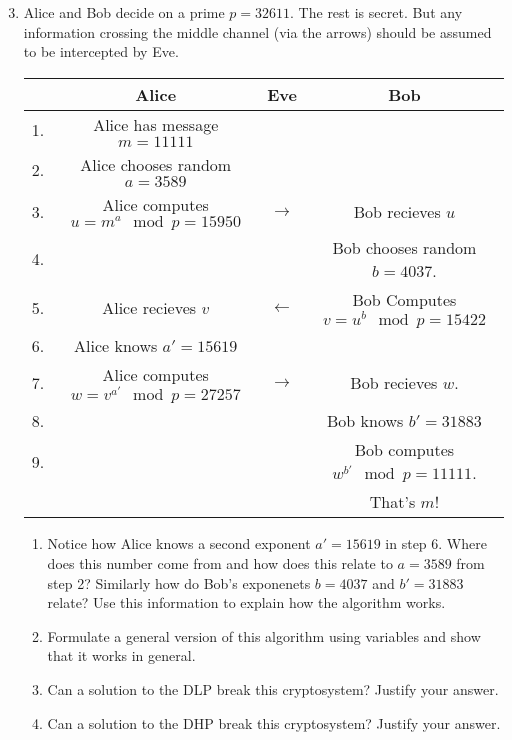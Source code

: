 \documentclass[11pt]{article}
\begin{document}
\begin{enumerate}
  \setcounter{enumi}{2}
  \item{
  Alice and Bob decide on a prime $p = 32611$.  The rest is secret.  But any information crossing the middle channel (via the arrows) should be assumed to be intercepted by Eve.\\
  \begin{tabular}{l|c||c||c}
    &Alice &Eve& Bob\\
    \hline\hline
    1.&Alice has message $m = 11111$&&\\
    \hline
    2.&Alice chooses random $a = 3589$&&\\
    \hline
    3.&Alice computes $u = m^a\mod p = 15950$ & $\longrightarrow$ &Bob recieves $u$\\
    \hline
    4.&&&Bob chooses random $b = 4037$.\\
    \hline
    5.&Alice recieves $v$ & $\longleftarrow$ & Bob Computes $v = u^b\mod p = 15422$\\
    \hline
    6.&Alice knows $a' = 15619$&&\\
    \hline
    7.&Alice computes $w=v^{a'}\mod p = 27257$&$\longrightarrow$&Bob recieves $w$.\\
    \hline
    8.&&&Bob knows $b' = 31883$\\
    \hline
    9.&&&Bob computes $w^{b'}\mod p = 11111$.\\
    &&&That's $m$!
  \end{tabular}
  \begin{enumerate}
    \item{
    Notice how Alice knows a second exponent $a'=15619$ in step 6.  Where does this number come from and how does this relate to $a=3589$ from step 2?  Similarly how do Bob's exponenets $b=4037$ and $b'=31883$ relate? Use this information to explain how the algorithm works.
    }
    \item{
    Formulate a general version of this algorithm using variables and show that it works in general.
    }
    \item{
    Can a solution to the DLP break this cryptosystem?  Justify your answer.
    }
    \item{
    Can a solution to the DHP break this cryptosystem?  Justify your answer.
    }
  \end{enumerate}
  }


\end{enumerate}
\end{document}
